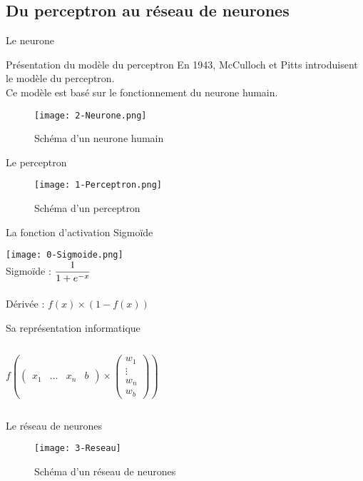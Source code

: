 \subsection{Du perceptron au réseau de neurones}

\begin{frame}{Le neurone}
	\begin{block}{Présentation du modèle du perceptron}
		En 1943, McCulloch et Pitts introduisent le modèle du perceptron.  \\
		Ce modèle est basé sur le fonctionnement du neurone humain.
	\end{block}
	\begin{figure}
		\centering
		\texttt{[image: 2-Neurone.png]}
		\caption{Schéma d'un neurone humain}
	\end{figure}
\end{frame}

\begin{frame}{Le perceptron}
	\begin{figure}
		\centering
		\texttt{[image: 1-Perceptron.png]}
		\caption{Schéma d'un perceptron}
	\end{figure}
\end{frame}


\begin{frame}{La fonction d'activation Sigmoïde}
	\begin{center}
		\centering
		\texttt{[image: 0-Sigmoide.png]} \\
		Sigmoïde : $\mathlarger{\frac{1}{1+e^{-x}}}$ \\~\\
		Dérivée : $f(x) \times (1-f(x))$
	\end{center}
\end{frame}


\begin{frame}{Sa représentation informatique}
	\begin{columns}
		\begin{column}[]{0.45\textwidth}
			\begin{center}
				$
					f
					\left(
					\begin{pmatrix}
						x_1 & \ldots & x_n & b
					\end{pmatrix}
					\times
					\begin{pmatrix}
						w_1    \\
						\vdots \\
						w_n    \\
						w_b
					\end{pmatrix}
					\right)
				$ \\
			\end{center}
		\end{column}
		\begin{column}[]{0.47\textwidth}
			
		\end{column}
	\end{columns}
\end{frame}



\begin{frame}{Le réseau de neurones}
	\begin{figure}
		\centering
		\texttt{[image: 3-Reseau]}
		\caption[]{Schéma d'un réseau de neurones}
	\end{figure}
\end{frame}